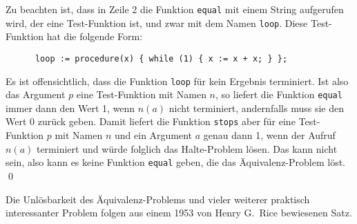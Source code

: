 Zu beachten ist, dass in Zeile 2 die Funktion \texttt{equal} mit einem String aufgerufen
wird, der eine Test-Funktion ist, und zwar mit dem Namen \texttt{loop}.  Diese 
Test-Funktion hat die
folgende Form:
\begin{verbatim}
      loop := procedure(x) { while (1) { x := x + x; } };
\end{verbatim}
Es ist offensichtlich, dass die Funktion \texttt{loop} f\"ur kein Ergebnis terminiert.
Ist also das Argument $p$ eine Test-Funktion mit Namen $n$, so liefert die Funktion
\texttt{equal} immer dann den Wert 1, 
wenn $n(a)$ nicht terminiert, andernfalls muss sie den Wert 0 zur\"uck geben.
Damit liefert die Funktion \texttt{stops} aber f\"ur eine Test-Funktion $p$ mit Namen $n$
und ein Argument 
$a$ genau dann 1, wenn der Aufruf $n(a)$ terminiert und w\"urde folglich das Halte-Problem
l\"osen.  Das kann nicht sein, also kann es keine Funktion  \texttt{equal}
geben, die das \"Aquivalenz-Problem l\"ost. 
\qed
\vspace*{0.3cm}

\noindent
Die Unl\"osbarkeit des \"Aquivalenz-Problems und vieler weiterer praktisch interessanter
Problem folgen aus einem 1953 von Henry G.~Rice \cite{rice:53} bewiesenen Satz.



